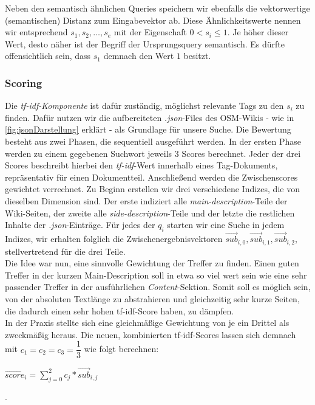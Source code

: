 \documentclass[12pt,pdftex,a4paper]{article}
\begin{document}
Neben den semantisch ähnlichen Queries speichern wir ebenfalls die vektorwertige (semantischen) Distanz zum Eingabevektor ab. Diese Ähnlichkeitswerte nennen wir entsprechend  $s_1, s_2, \dots, s_e$ mit der Eigenschaft $0 < s_i \leq 1$. Je höher dieser Wert, desto näher ist der Begriff der Ursprungsquery semantisch. Es dürfte offensichtlich sein, dass $s_1$ demnach den Wert $1$ besitzt.

\subsubsection{Scoring}\label{sec:scoring}
Die \textit{tf-idf-Komponente} ist dafür zuständig, möglichst relevante Tags zu den $s_i$ zu finden. Dafür nutzen wir die aufbereiteten \textit{.json}-Files des OSM-Wikis -  wie in \autoref{fig:jsonDarstellung} erklärt - als Grundlage für unsere Suche.
Die Bewertung besteht aus zwei Phasen, die sequentiell ausgeführt werden. In der ersten Phase werden zu einem gegebenen Suchwort jeweils 3 Scores berechnet. Jeder der drei Scores beschreibt hierbei den \textit{tf-idf}-Wert innerhalb eines Tag-Dokuments, repräsentativ für einen Dokumentteil.
Anschließend werden die Zwischenscores gewichtet verrechnet.
Zu Beginn erstellen wir drei verschiedene Indizes, die von dieselben Dimension sind. Der erste indiziert alle \textit{main-description}-Teile der Wiki-Seiten, der zweite alle \textit{side-description}-Teile und der letzte die restlichen Inhalte der \textit{.json}-Einträge. 
Für jedes der $q_i$ starten wir eine Suche in jedem Indizes, wir erhalten folglich die Zwischenergebnisvektoren $\vec{sub}_{i,0}, \vec{sub}_{i,1}, \vec{sub}_{i,2}$, stellvertretend für die drei Teile.\\
Die Idee war nun, eine sinnvolle Gewichtung der Treffer zu finden. Einen guten Treffer in der kurzen Main-Description soll in etwa so viel wert sein wie eine sehr passender Treffer in der ausführlichen \textit{Content}-Sektion. Somit soll es möglich sein, von der absoluten Textlänge zu abstrahieren und gleichzeitig sehr kurze Seiten, die dadurch einen sehr hohen tf-idf-Score haben, zu dämpfen.\\
In der Praxis stellte sich eine gleichmäßige Gewichtung von je ein Drittel als zweckmäßig heraus. Die neuen, kombinierten tf-idf-Scores lassen sich demnach mit $c_1 = c_2 = c_3 = \dfrac{1}{3}$ wie folgt berechnen:\\
\begin{center}
	$\vec{score}_{i} = \sum_{j=0}^{2} c_j * \vec{sub}_{i,j}$
\end{center}.
\end{document}
